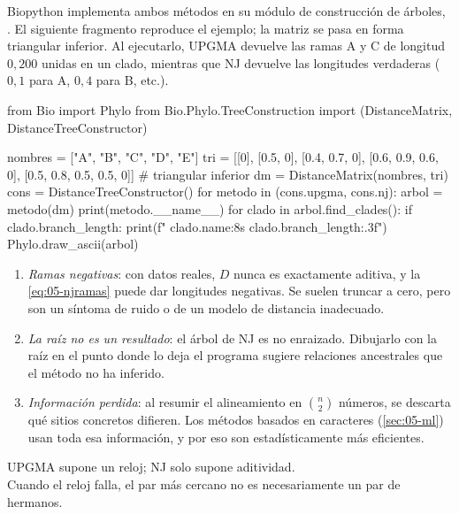 Biopython implementa ambos métodos en su módulo de construcción de árboles,\\ . El siguiente fragmento reproduce el ejemplo; la matriz se pasa en forma triangular inferior. Al ejecutarlo, UPGMA devuelve las ramas A y C de longitud $0{,}200$ unidas en un clado, mientras que NJ devuelve las longitudes verdaderas ($0{,}1$ para A, $0{,}4$ para B, etc.).

\begin{codigo}
from Bio import Phylo
from Bio.Phylo.TreeConstruction import (DistanceMatrix,
                                        DistanceTreeConstructor)

nombres = ["A", "B", "C", "D", "E"]
tri = [[0],
       [0.5, 0],
       [0.4, 0.7, 0],
       [0.6, 0.9, 0.6, 0],
       [0.5, 0.8, 0.5, 0.5, 0]]           # triangular inferior
dm = DistanceMatrix(nombres, tri)
cons = DistanceTreeConstructor()
for metodo in (cons.upgma, cons.nj):
    arbol = metodo(dm)
    print(metodo.__name__)
    for clado in arbol.find_clades():
        if clado.branch_length:
            print(f"  {clado.name:8s} {clado.branch_length:.3f}")
    Phylo.draw_ascii(arbol)
\end{codigo}

\begin{cuidado}
\begin{enumerate}
  \item \emph{Ramas negativas}: con datos reales, $D$ nunca es exactamente aditiva, y la \cref{eq:05-njramas} puede dar longitudes negativas. Se suelen truncar a cero, pero son un síntoma de ruido o de un modelo de distancia inadecuado.
  \item \emph{La raíz no es un resultado}: el árbol de NJ es no enraizado. Dibujarlo con la raíz en el punto donde lo deja el programa sugiere relaciones ancestrales que el método no ha inferido.
  \item \emph{Información perdida}: al resumir el alineamiento en $\binom{n}{2}$ números, se descarta qué sitios concretos difieren. Los métodos basados en caracteres (\cref{sec:05-ml}) usan toda esa información, y por eso son estadísticamente más eficientes.
\end{enumerate}
\end{cuidado}

\begin{ideaclave}
UPGMA supone un reloj; NJ solo supone aditividad.\\
Cuando el reloj falla, el par más cercano no es necesariamente un par de hermanos.
\end{ideaclave}

